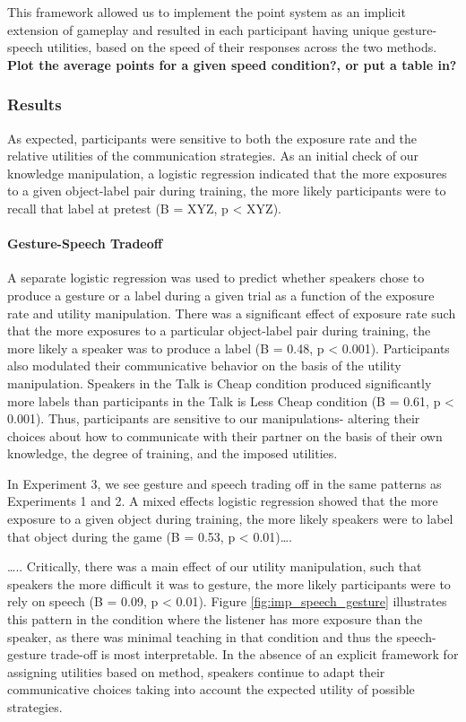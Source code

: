 \documentclass[10pt, letterpaper]{article}
\begin{document}
This framework allowed us to implement the point system as an implicit
extension of gameplay and resulted in each participant having unique
gesture-speech utilities, based on the speed of their responses across
the two methods. \textbf{Plot the average points for a given speed
condition?, or put a table in?}

\subsubsection{Results}\label{results-1}

As expected, participants were sensitive to both the exposure rate and
the relative utilities of the communication strategies. As an initial
check of our knowledge manipulation, a logistic regression indicated
that the more exposures to a given object-label pair during training,
the more likely participants were to recall that label at pretest (B =
XYZ, p \textless{} XYZ).

\paragraph{Gesture-Speech Tradeoff}\label{gesture-speech-tradeoff}

A separate logistic regression was used to predict whether speakers
chose to produce a gesture or a label during a given trial as a function
of the exposure rate and utility manipulation. There was a significant
effect of exposure rate such that the more exposures to a particular
object-label pair during training, the more likely a speaker was to
produce a label (B = 0.48, p \textless{} 0.001). Participants also
modulated their communicative behavior on the basis of the utility
manipulation. Speakers in the Talk is Cheap condition produced
significantly more labels than participants in the Talk is Less Cheap
condition (B = 0.61, p \textless{} 0.001). Thus, participants are
sensitive to our manipulations- altering their choices about how to
communicate with their partner on the basis of their own knowledge, the
degree of training, and the imposed utilities.

In Experiment 3, we see gesture and speech trading off in the same
patterns as Experiments 1 and 2. A mixed effects logistic regression
showed that the more exposure to a given object during training, the
more likely speakers were to label that object during the game (B =
0.53, p \textless{} 0.01)\ldots{}.

\ldots{}.. Critically, there was a main effect of our utility
manipulation, such that speakers the more difficult it was to gesture,
the more likely participants were to rely on speech (B = 0.09, p
\textless{} 0.01). Figure \ref{fig:imp_speech_gesture} illustrates this
pattern in the condition where the listener has more exposure than the
speaker, as there was minimal teaching in that condition and thus the
speech-gesture trade-off is most interpretable. In the absence of an
explicit framework for assigning utilities based on method, speakers
continue to adapt their communicative choices taking into account the
expected utility of possible strategies.
\end{document}
